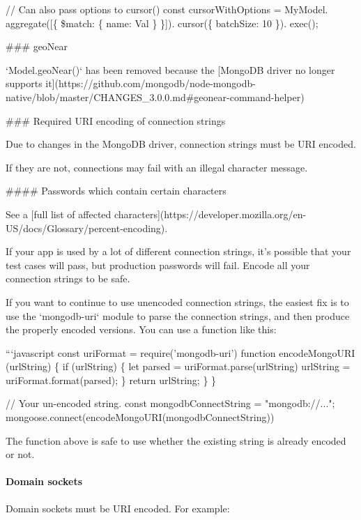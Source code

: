 // Can also pass options to {\ttfamily cursor()} const cursor\+With\+Options = My\+Model. aggregate(\mbox{[}\{ \$match\+: \{ name\+: \textquotesingle{}Val\textquotesingle{} \} \}\mbox{]}). cursor(\{ batch\+Size\+: 10 \}). exec(); 
\begin{DoxyCode}
### geoNear

`Model.geoNear()` has been removed because the [MongoDB driver no longer supports
       it](https://github.com/mongodb/node-mongodb-native/blob/master/CHANGES\_3.0.0.md#geonear-command-helper)

### Required URI encoding of connection strings

Due to changes in the MongoDB driver, connection strings must be URI encoded.

If they are not, connections may fail with an illegal character message.

#### Passwords which contain certain characters

See a [full list of affected
       characters](https://developer.mozilla.org/en-US/docs/Glossary/percent-encoding).

If your app is used by a lot of different connection strings, it's possible
that your test cases will pass, but production passwords will fail. Encode all your connection
strings to be safe.

If you want to continue to use unencoded connection strings, the easiest fix is to use
the `mongodb-uri` module to parse the connection strings, and then produce the properly encoded
versions. You can use a function like this:

```javascript
const uriFormat = require('mongodb-uri')
function encodeMongoURI (urlString) \{
    if (urlString) \{
      let parsed = uriFormat.parse(urlString)
      urlString = uriFormat.format(parsed);
    \}
    return urlString;
  \}
\}

// Your un-encoded string.
const mongodbConnectString = "mongodb://...";
mongoose.connect(encodeMongoURI(mongodbConnectString))
\end{DoxyCode}


The function above is safe to use whether the existing string is already encoded or not.

\paragraph*{Domain sockets}

Domain sockets must be U\+RI encoded. For example\+:


